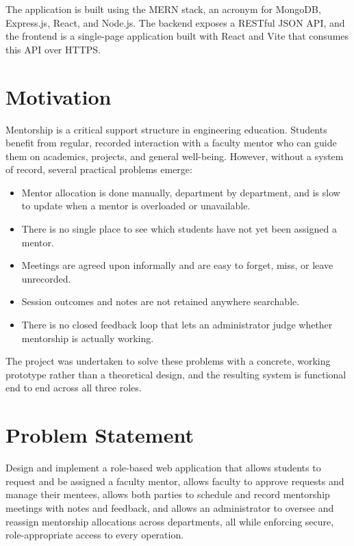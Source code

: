 \documentclass[12pt,a4paper]{report}
\newcommand{\sectionrule}{\vspace{-4pt}{\color{lightgray}\hrule height 1pt}\vspace{8pt}}
\begin{document}
The application is built using the MERN stack, an acronym for MongoDB, Express.js, React, and Node.js. The backend exposes a RESTful JSON API, and the frontend is a single-page application built with React and Vite that consumes this API over HTTPS.

\section{Motivation}
\sectionrule
Mentorship is a critical support structure in engineering education. Students benefit from regular, recorded interaction with a faculty mentor who can guide them on academics, projects, and general well-being. However, without a system of record, several practical problems emerge:

\begin{itemize}[itemsep=2pt]
  \item Mentor allocation is done manually, department by department, and is slow to update when a mentor is overloaded or unavailable.
  \item There is no single place to see which students have not yet been assigned a mentor.
  \item Meetings are agreed upon informally and are easy to forget, miss, or leave unrecorded.
  \item Session outcomes and notes are not retained anywhere searchable.
  \item There is no closed feedback loop that lets an administrator judge whether mentorship is actually working.
\end{itemize}

The project was undertaken to solve these problems with a concrete, working prototype rather than a theoretical design, and the resulting system is functional end to end across all three roles.

\section{Problem Statement}
\sectionrule
Design and implement a role-based web application that allows students to request and be assigned a faculty mentor, allows faculty to approve requests and manage their mentees, allows both parties to schedule and record mentorship meetings with notes and feedback, and allows an administrator to oversee and reassign mentorship allocations across departments, all while enforcing secure, role-appropriate access to every operation.
\end{document}

